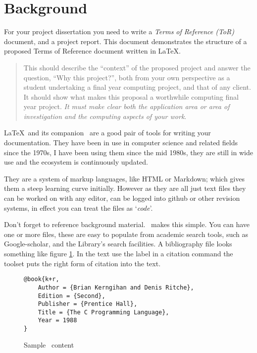 
\section{Background}
For your project dissertation you need to write a \emph{Terms of Reference
(ToR)} document, and a project report.
This document demonstrates the structure of a proposed Terms of Reference document written in \LaTeX.

\begin{quotation}
This should describe the ``context'' of the proposed project and answer the
question, ``Why this project?'', both from your own perspective as a student
undertaking a final year computing project, and that of any client.  It should
show what makes this proposal a worthwhile computing final year project.
\emph{It must make clear both the application area or area of investigation
and the computing aspects of your work}.
\end{quotation}

\LaTeX\ and its companion \BibTeX\ are a good pair of tools for writing your
documentation.  They have been in use in computer science and related fields
since the 1970s, I have been using them since the mid 1980s, they are still in
wide use and the ecosystem is continuously updated.

They are a system of markup languages, like HTML or Markdown; which gives
them a steep learning curve initially.  However as they are all just text
files they can be worked on with any editor, can be logged into github or
other revision systems, in effect you can treat the files as `\emph{code}'.

Don't forget to reference background material.  \BibTeX\ makes this simple.
You can have one or more  files, these are  easy to populate from
academic search tools, such as Google-scholar, and the Library's search
facilities.  A bibliography file looks something like figure
\ref{bibtex-sample}.  In the text use the label in a citation command
	\texttt{\citep{k+r}} the toolset puts the right form of citation
	\citep[pages 2--4]{k+r} into the text.


\begin{figure}
\begin{tcolorbox}
\begin{verbatim}
@book{k+r,
	Author = {Brian Kerngihan and Denis Ritche},
	Edition = {Second},
	Publisher = {Prentice Hall},
	Title = {The C Programming Language},
	Year = 1988
}
\end{verbatim}
\end{tcolorbox}
\caption{Sample \BibTeX\ content}
\label{bibtex-sample}
\end{figure}

